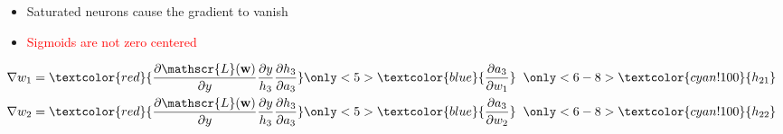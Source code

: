 \begin{frame}{}
	\begin{columns}
		\begin{overlayarea}{\textwidth}{\textheight}
			\vspace{0.1cm}
			 
			\begin{itemize}
				\justifying
				\item Saturated neurons cause the gradient to vanish
				      \item<2-> \textcolor{red}{Sigmoids are not zero centered}
			\end{itemize}
			 
			\vspace{0.01cm}
			\begin{itemize}
				\justifying
				\vspace{0.01cm}
				\vspace{-1em}
				{
					\begin{align*}
						\nabla w_1 &= \textcolor{red}{\frac{\partial{  \mathscr{L}(\textbf{w})  }}{\partial{y}} \frac{\partial{y}}{h_3} \frac{\partial{h_3}}{\partial{a_3}}} \only<5>{\textcolor{blue}{\frac{\partial{a_3}}{\partial{w_1}}}}  \hspace{0.2cm}\only<6-8>{\textcolor{cyan!100}{h_{21}}} \\
						\nabla w_2 &= \textcolor{red}{\frac{\partial{  \mathscr{L}(\textbf{w})  }}{\partial{y}} \frac{\partial{y}}{h_3} \frac{\partial{h_3}}{\partial{a_3}}} \only<5>{\textcolor{blue}{\frac{\partial{a_3}}{\partial{w_2}}}}  \hspace{0.2cm}\only<6-8>{\textcolor{cyan!100}{h_{22}}}
					\end{align*}
					   
				}
				
				

\end{itemize}
\end{overlayarea}
\end{columns}
\end{frame}
